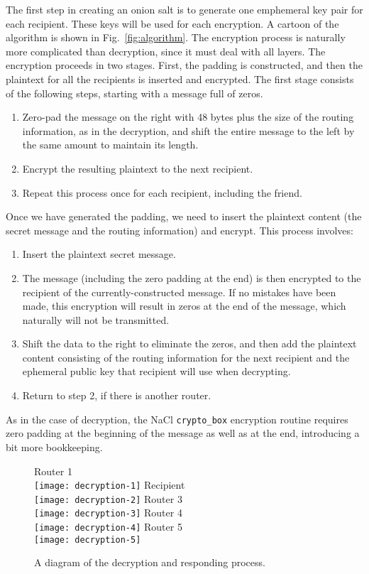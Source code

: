 \documentclass[letterpaper,twocolumn,amsmath,amssymb,pre,aps,10pt]{revtex4-1}
\begin{document}
The first step in creating an onion salt is to generate one emphemeral
key pair for each recipient.  These keys will be used for each
encryption.  A cartoon of the algorithm is shown in
Fig.~\ref{fig:algorithm}.  The encryption process is naturally more
complicated than decryption, since it must deal with all layers.  The
encryption proceeds in two stages.  First, the padding is constructed,
and then the plaintext for all the recipients is inserted and
encrypted.  The first stage consists of the following steps, starting
with a message full of zeros.
\begin{enumerate}
\item Zero-pad the message on the right with 48 bytes plus the size of
  the routing information, as in the decryption, and shift the entire
  message to the left by the same amount to maintain its length.
\item Encrypt the resulting plaintext to the next recipient.
\item Repeat this process once for each recipient, including the
  friend.
\end{enumerate}
Once we have generated the padding, we need to insert the plaintext
content (the secret message and the routing information) and encrypt.
This process involves:
\begin{enumerate}
\item Insert the plaintext secret message.
\item The message (including the zero padding at the end) is then
  encrypted to the recipient of the currently-constructed message.  If
  no mistakes have been made, this encryption will result in zeros at
  the end of the message, which naturally will not be transmitted.
\item Shift the data to the right to eliminate the zeros, and then add
  the plaintext content consisting of the routing information for the
  next recipient and the ephemeral public key that recipient will use
  when decrypting.
\item Return to step 2, if there is another router.
\end{enumerate}
As in the case of decryption, the NaCl \texttt{crypto\_box} encryption
routine requires zero padding at the beginning of the message as well
as at the end, introducing a bit more bookkeeping.

\begin{figure*}
  \begin{center}
    Router 1\\
    \texttt{[image: decryption-1]}
    Recipient\\
    \texttt{[image: decryption-2]}
    Router 3\\
    \texttt{[image: decryption-3]}
    Router 4\\
    \texttt{[image: decryption-4]}
    Router 5\\
    \texttt{[image: decryption-5]}
  \end{center}
  \caption{A diagram of the decryption and responding
    process.}\label{fig:decryption-and-responding}
\end{figure*}
\end{document}
